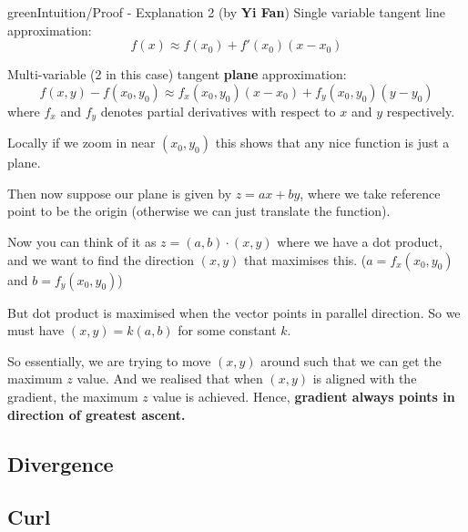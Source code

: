 \begin{mybox}{green}{Intuition/Proof - Explanation 2 (by \textbf{Yi Fan})}
    Single variable tangent line approximation:
    \begin{equation}
        f(x)\approx f(x_0)+ f'(x_0)(x-x_0)
    \end{equation}

    Multi-variable (2 in this case) tangent \textbf{plane} approximation:
    \begin{equation}
        f(x,y)-f(x_0,y_0) \approx f_x(x_0,y_0)(x-x_0) + f_y(x_0,y_0)(y-y_0)
    \end{equation}
    where $f_x$ and $f_y$ denotes partial derivatives with respect to $x$ and $y$ respectively.

    \begin{flushleft}
        Locally if we zoom in near $(x_0, y_0)$ this shows that any nice function is just a plane.
    \end{flushleft}
    \begin{flushleft}
        Then now suppose our plane is given by $z = ax + by$, where we take reference point to be the origin (otherwise we can just translate the function).
    \end{flushleft}
    \begin{flushleft}
        Now you can think of it as $z = (a,b)\cdot (x,y)$ where we have a dot product, and we want to find the direction $(x,y)$ that maximises this. ($a = f_x(x_0, y_0)$ and $b = f_y(x_0,y_0)$)
    \end{flushleft}
    \begin{flushleft}
        But dot product is maximised when the vector points in parallel direction. So we must have $(x,y) = k(a,b)$ for some constant $k$.
    \end{flushleft}
    \begin{flushleft}
        So essentially, we are trying to move $(x,y)$ around such that we can get the maximum $z$ value. And we realised that when $(x,y)$ is aligned with the gradient, the maximum $z$ value is achieved. Hence, \textbf{gradient always points in direction of greatest ascent.}
    \end{flushleft}

\end{mybox}

\subsection{Divergence}
\subsection{Curl}


